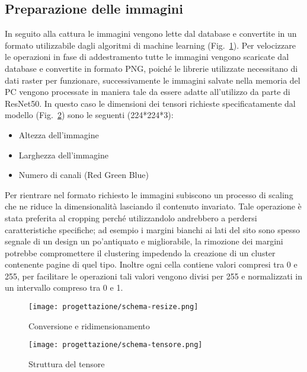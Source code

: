 \subsection{Preparazione delle immagini}
In seguito alla cattura le immagini vengono lette dal database e convertite in un formato utilizzabile dagli algoritmi di machine learning (Fig.~\ref{fig:schema-resize}).
Per velocizzare le operazioni in fase di addestramento tutte le immagini vengono scaricate dal database e convertite in formato PNG, poiché le librerie utilizzate necessitano di dati raster per funzionare, successivamente le immagini salvate nella memoria del PC vengono processate in maniera tale da essere adatte all'utilizzo da parte di ResNet50.
In questo caso le dimensioni dei tensori richieste specificatamente dal modello (Fig.~\ref{fig:schema-tensore}) sono le seguenti (224*224*3):
\begin{itemize}
  \item Altezza dell'immagine
  \item Larghezza dell'immagine 
  \item Numero di canali (Red Green Blue)
\end{itemize}
Per rientrare nel formato richiesto le immagini subiscono un processo di scaling che ne riduce la dimensionalità lasciando il contenuto invariato.
Tale operazione è stata preferita al cropping perché utilizzandolo andrebbero a perdersi caratteristiche specifiche; ad esempio i margini bianchi ai lati del sito sono spesso segnale di un design un po'antiquato e migliorabile,  
la rimozione dei margini potrebbe compromettere il clustering impedendo la creazione di un cluster contenente pagine di quel tipo.
Inoltre ogni cella contiene valori compresi tra 0 e 255, per facilitare le operazioni tali valori vengono divisi per 255 e normalizzati in un intervallo compreso tra 0 e 1.

\begin{figure}[!h] 
  \centering 
  \texttt{[image: progettazione/schema-resize.png]} 
  \caption{Conversione e ridimensionamento}
  \label{fig:schema-resize}
\end{figure}

\begin{figure}[!h] 
  \centering 
  \texttt{[image: progettazione/schema-tensore.png]} 
  \caption{Struttura del tensore}
  \label{fig:schema-tensore}
\end{figure}

